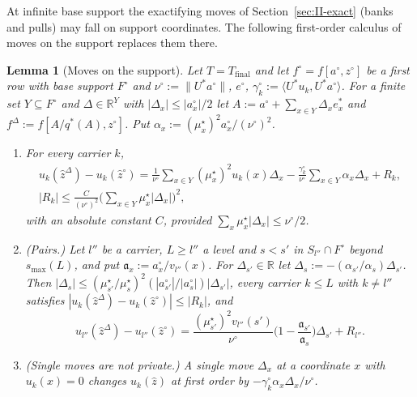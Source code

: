 \documentclass[10pt]{amsart}
\newtheorem{lemma}[theorem]{Lemma}
\theoremstyle{definition}
\theoremstyle{remark}
\newcommand{\R}{\mathbb R}
\newcommand{\zh}{\hat z}
\newcommand{\ip}[2]{\langle #1,#2\rangle}
\begin{document}
At infinite base support the exactifying moves of Section~\ref{sec:II-exact}
(banks and pulls) may fall on support coordinates.  The following
first-order calculus of moves on the support replaces them there.

\begin{lemma}[Moves on the support]\label{lem:II-TR}
Let $T=T_{\mathrm{final}}$ and let $f^\circ=f[a^\circ,z^\circ]$ be a first row
with base support $F^\circ$ and $\nu^\circ:=\|U^*a^\circ\|$, $e^\circ$,
$\gamma^\circ_k:=\ip{U^*u_k}{U^*a^\circ}$.  For a finite set $Y\subseteq F^\circ$
and $\Delta\in\R^Y$ with $|\Delta_x|\le|a^\circ_x|/2$ let
$A:=a^\circ+\sum_{x\in Y}\Delta_xe^*_x$ and $f^\Delta:=f[A/q^*(A),z^\circ]$.  Put
$\alpha_x:=(\mu^\star_x)^2a^\circ_x/(\nu^\circ)^2$.
\begin{enumerate}
\item[(a)] For every carrier $k$,
\begin{gather*}
 u_k(\zh^\Delta)-u_k(\zh^\circ)=\frac1{\nu^\circ}\sum_{x\in Y}(\mu^\star_x)^2
 u_k(x)\Delta_x-\frac{\gamma^\circ_k}{\nu^\circ}\sum_{x\in Y}\alpha_x\Delta_x+
 R_k,\\ |R_k|\le\frac{C}{(\nu^\circ)^2}\Big(\sum_{x\in Y}\mu^\star_x|\Delta_x|
 \Big)^2,
\end{gather*}
with an absolute constant $C$, provided $\sum_x\mu^\star_x|\Delta_x|\le
\nu^\circ/2$.
\item[(b)] \textup{(Pairs.)}  Let $l''$ be a carrier, $L\ge l''$ a level and
$s<s'$ in $S_{l''}\cap F^\circ$ beyond $s_{\max}(L)$, and put
$\mathfrak a_x:=a^\circ_x/v_{l''}(x)$.  For $\Delta_{s'}\in\R$ let
$\Delta_s:=-(\alpha_{s'}/\alpha_s)\Delta_{s'}$.  Then $|\Delta_s|\le
(\mu^\star_{s'}/\mu^\star_s)^2(|a^\circ_{s'}|/|a^\circ_s|)|\Delta_{s'}|$, every
carrier $k\le L$ with $k\ne l''$ satisfies $|u_k(\zh^\Delta)-u_k(\zh^\circ)|\le
|R_k|$, and
\[
 u_{l''}(\zh^\Delta)-u_{l''}(\zh^\circ)=\frac{(\mu^\star_{s'})^2v_{l''}(s')}
 {\nu^\circ}\Big(1-\frac{\mathfrak a_{s'}}{\mathfrak a_s}\Big)\Delta_{s'}+R_{l''} .
\]
\item[(c)] \textup{(Single moves are not private.)}  A single move $\Delta_x$
at a coordinate $x$ with $u_k(x)=0$ changes $u_k(\zh)$ at first order by
$-\gamma^\circ_k\alpha_x\Delta_x/\nu^\circ$.
\end{enumerate}
\end{lemma}
\end{document}
